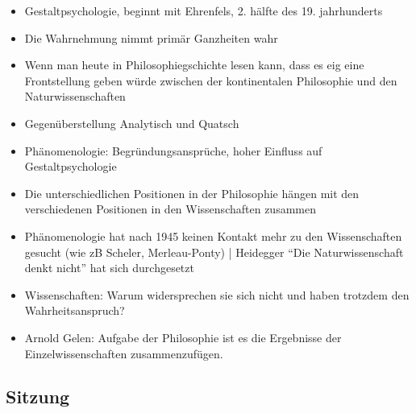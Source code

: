 \documentclass[emulatestandardclasses]{scrartcl}
\begin{document}
\begin{itemize}
  \item Gestaltpsychologie, beginnt mit Ehrenfels, 2. hälfte des 19. jahrhunderts
  \item Die Wahrnehmung nimmt primär Ganzheiten wahr
  \item Wenn man heute in Philosophiegschichte lesen kann, dass es eig eine Frontstellung geben würde zwischen der kontinentalen Philosophie und den Naturwissenschaften
  \item Gegenüberstellung Analytisch und Quatsch
  \item Phänomenologie: Begründungsansprüche, hoher Einfluss auf Gestaltpsychologie
  \item Die unterschiedlichen Positionen in der Philosophie hängen mit den verschiedenen Positionen in den Wissenschaften zusammen
  \item Phänomenologie hat nach 1945 keinen Kontakt mehr zu den Wissenschaften gesucht (wie zB Scheler, Merleau-Ponty) | Heidegger "`Die Naturwissenschaft denkt nicht"' hat sich durchgesetzt
  \item Wissenschaften: Warum widersprechen sie sich nicht und haben trotzdem den Wahrheitsanspruch?
  \item Arnold Gelen: Aufgabe der Philosophie ist es die Ergebnisse der Einzelwissenschaften zusammenzufügen.
\end{itemize}

\subsection{Sitzung}
\end{document}
